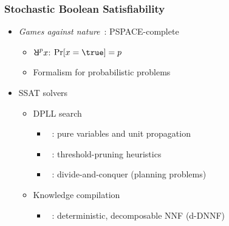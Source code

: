 \begin{frame}
    \frametitle{Stochastic Boolean Satisfiability}
    \begin{itemize}
        \item \textit{Games against nature}~\cite{Papadimitriou1985}: PSPACE-complete~\cite{Stockmeyer1973}
              \pause
              \begin{itemize}
                  \item $\random{p}x$: $\spb{x=\true}=p$
                        \pause
                  \item Formalism for probabilistic problems~\cite{SATHandbook-SSAT}
                        \pause
              \end{itemize}
        \item SSAT solvers
              \pause
              \begin{itemize}
                  \item DPLL search~\cite{Davis1962}
                        \pause
                        \begin{itemize}
                            \item \maxplan~\cite{Majercik1998}: pure variables and unit propagation
                                  \pause
                            \item \zander~\cite{Majercik2003}: threshold-pruning heuristics
                                  \pause
                            \item \dcssat~\cite{Majercik2005}: divide-and-conquer (planning problems)
                                  \pause
                        \end{itemize}
                  \item Knowledge compilation~\cite{Darwiche2002KnowledgeCompilation}
                        \pause
                        \begin{itemize}
                            \item \complan~\cite{Huang2006}: deterministic, decomposable NNF (d-DNNF)~\cite{Darwiche2001,Darwiche2002dDNNF}
                        \end{itemize}
              \end{itemize}
    \end{itemize}
\end{frame}